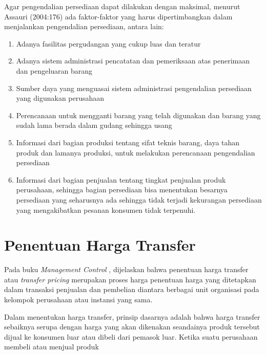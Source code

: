 \begin{spacing}{1.5}
Agar pengendalian persediaan dapat dilakukan dengan maksimal, menurut Assauri (2004:176) ada faktor-faktor yang harus dipertimbangkan dalam menjalankan pengendalian persediaan, antara lain:

\begin{enumerate}
	\item Adanya fasilitas pergudangan yang cukup luas dan teratur
	\item Adanya sistem administrasi pencatatan dan pemeriksaan atas penerimaan dan pengeluaran barang
	\item Sumber daya yang menguasai sistem administrasi pengendalian persediaan yang digunakan perusahaan
	\item Perencanaan untuk mengganti barang yang telah digunakan dan barang yang sudah lama berada dalam gudang sehingga usang
	\item Informasi dari bagian produksi tentang sifat teknis barang, daya tahan produk dan lamanya produksi, untuk melakukan perencanaan pengendalian persediaan
	\item Informasi dari bagian penjualan tentang tingkat penjualan produk perusahaan, sehingga bagian persediaan bisa menentukan besarnya persediaan yang seharusnya ada sehingga tidak terjadi kekurangan persediaan yang mengakibatkan pesanan konsumen tidak terpenuhi.
\end{enumerate}

\section{Penentuan Harga Transfer}

Pada buku \textit{Management Control} \citep{manajemencontrol}, dijelaskan bahwa penentuan harga transfer atau \textit{transfer pricing} merupakan proses harga penentuan harga yang ditetapkan dalam transaksi penjualan dan pembelian diantara berbagai unit organisasi pada kelompok perusahaan atau instansi yang sama.

Dalam menentukan harga transfer, prinsip dasarnya adalah bahwa harga transfer sebaiknya serupa dengan harga yang akan dikenakan seandainya produk tersebut dijual ke konsumen luar atau dibeli dari pemasok luar. Ketika suatu perusahaan membeli atau menjual produk



\end{spacing}
